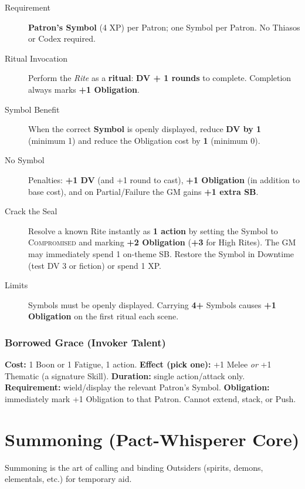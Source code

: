 \begin{description}
    \item[Requirement] \textbf{Patron's Symbol} (4 XP) per Patron; one Symbol per Patron. No Thiasos or Codex required.
    \item[Ritual Invocation] Perform the \emph{Rite} as a \textbf{ritual}: \textbf{DV + 1 rounds} to complete. Completion always marks \textbf{+1 Obligation}.
    \item[Symbol Benefit] When the correct \textbf{Symbol} is openly displayed, reduce \textbf{DV by 1} (minimum 1) and reduce the Obligation cost by \textbf{1} (minimum 0).
    \item[No Symbol] Penalties: \textbf{+1 DV} (and +1 round to cast), \textbf{+1 Obligation} (in addition to base cost), and on Partial/Failure the GM gains \textbf{+1 extra SB}.
    \item[Crack the Seal] Resolve a known Rite instantly as \textbf{1 action} by setting the Symbol to \textsc{Compromised} and marking \textbf{+2 Obligation} (\textbf{+3} for High Rites). The GM may immediately spend 1 on-theme SB. Restore the Symbol in Downtime (test DV 3 or fiction) or spend 1 XP.
    \item[Limits] Symbols must be openly displayed. Carrying \textbf{4+} Symbols causes \textbf{+1 Obligation} on the first ritual each scene.
\end{description}

\subsubsection*{Borrowed Grace (Invoker Talent)}\label{talent:borrowed_grace}

\textbf{Cost:} 1 Boon or 1 Fatigue, 1 action. \textbf{Effect (pick one):} +1 Melee \emph{or} +1 Thematic (a signature Skill). \textbf{Duration:} single action/attack only. \textbf{Requirement:} wield/display the relevant Patron's Symbol. \textbf{Obligation:} immediately mark +1 Obligation to that Patron. Cannot extend, stack, or Push.

\section{Summoning (Pact-Whisperer Core)}\label{sec:summoning}

Summoning is the art of calling and binding Outsiders (spirits, demons, elementals, etc.) for temporary aid.

